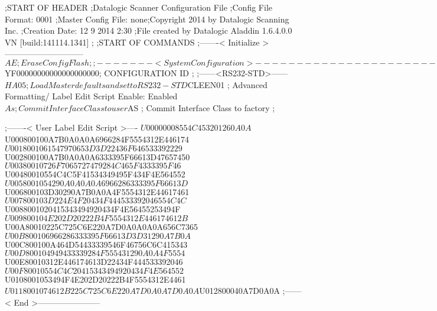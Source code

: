 ;START OF HEADER
;Datalogic Scanner Configuration File
;Config File Format: 0001
;Master Config File: none;Copyright 2014 by Datalogic Scanning Inc.
;Creation Date: 12 9 2014 2:30
;File created by Datalogic Aladdin 1.6.4.0.0 VN [build:141114.1341]
;
;START OF COMMANDS
;-------< Initialize >-----------------------------
$AE                 ; Erase Config Flash
;
;-------< System Configuration >-------------------------------
$YF00000000000000000000; CONFIGURATION ID
;
;------<RS232-STD>------
$HA05               ; Load Master defaults and set to RS232-STD
$CLEEN01            ; Advanced Formatting/ Label Edit Script Enable: Enabled
$As                 ; Commit Interface Class to user
$AS                 ; Commit Interface Class to factory
;

;-------< User Label Edit Script >----
$U00000008554C453201260A0A
$U000800100A7B0A0A0A6966284F5554312E446174
$U0018001061547970653D3D22436F646533392229
$U002800100A7B0A0A0A6333395F66613D47657450
$U00380010726F7065727479284C465F4333395F46
$U00480010554C4C5F41534349495F434F4E564552
$U0058001054290A0A0A0A6966286333395F66613D
$U006800103D30290A7B0A0A4F5554312E44617461
$U007800103D224E4F20434F444533392046554C4C
$U0088001020415343494920434F4E56455253494F
$U009800104E202D20222B4F5554312E446174612B
$U00A80010225C725C6E220A7D0A0A0A0A656C7365
$U00B800106966286333395F66613D3D31290A7B0A
$U00C800100A464D54433339546F46756C6C415343
$U00D800104949433339284F555431290A0A4F5554
$U00E80010312E446174613D22434F444533392046
$U00F80010554C4C20415343494920434F4E564552
$U0108001053494F4E202D20222B4F5554312E4461
$U0118001074612B225C725C6E220A7D0A0A7D0A0A
$U012800040A7D0A0A
;------< End >-----------------------

